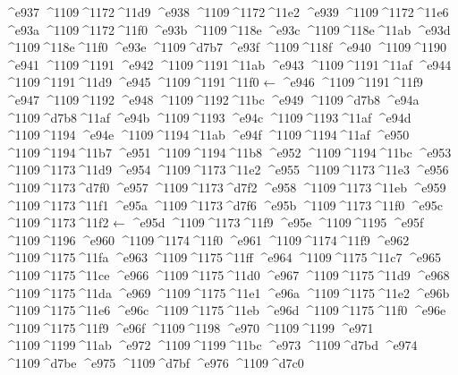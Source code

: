 \checkit ^^^^e937 ^^^^1109^^^^1172^^^^11d9
\checkit ^^^^e938 ^^^^1109^^^^1172^^^^11e2
\checkit ^^^^e939 ^^^^1109^^^^1172^^^^11e6
\checkit ^^^^e93a ^^^^1109^^^^1172^^^^11f0
\checkit ^^^^e93b ^^^^1109^^^^118e
\checkit ^^^^e93c ^^^^1109^^^^118e^^^^11ab
\checkit ^^^^e93d ^^^^1109^^^^118e^^^^11f0
\checkit ^^^^e93e ^^^^1109^^^^d7b7
\checkit ^^^^e93f ^^^^1109^^^^118f
\checkit ^^^^e940 ^^^^1109^^^^1190
\checkit ^^^^e941 ^^^^1109^^^^1191
\checkit ^^^^e942 ^^^^1109^^^^1191^^^^11ab
\checkit ^^^^e943 ^^^^1109^^^^1191^^^^11af
\checkit ^^^^e944 ^^^^1109^^^^1191^^^^11d9
\checkit ^^^^e945 ^^^^1109^^^^1191^^^^11f0 ←
\checkit ^^^^e946 ^^^^1109^^^^1191^^^^11f9
\checkit ^^^^e947 ^^^^1109^^^^1192
\checkit ^^^^e948 ^^^^1109^^^^1192^^^^11bc
\checkit ^^^^e949 ^^^^1109^^^^d7b8
\checkit ^^^^e94a ^^^^1109^^^^d7b8^^^^11af
\checkit ^^^^e94b ^^^^1109^^^^1193
\checkit ^^^^e94c ^^^^1109^^^^1193^^^^11af
\checkit ^^^^e94d ^^^^1109^^^^1194
\checkit ^^^^e94e ^^^^1109^^^^1194^^^^11ab
\checkit ^^^^e94f ^^^^1109^^^^1194^^^^11af
\checkit ^^^^e950 ^^^^1109^^^^1194^^^^11b7
\checkit ^^^^e951 ^^^^1109^^^^1194^^^^11b8
\checkit ^^^^e952 ^^^^1109^^^^1194^^^^11bc
\checkit ^^^^e953 ^^^^1109^^^^1173^^^^11d9
\checkit ^^^^e954 ^^^^1109^^^^1173^^^^11e2
\checkit ^^^^e955 ^^^^1109^^^^1173^^^^11e3
\checkit ^^^^e956 ^^^^1109^^^^1173^^^^d7f0
\checkit ^^^^e957 ^^^^1109^^^^1173^^^^d7f2
\checkit ^^^^e958 ^^^^1109^^^^1173^^^^11eb
\checkit ^^^^e959 ^^^^1109^^^^1173^^^^11f1
\checkit ^^^^e95a ^^^^1109^^^^1173^^^^d7f6
\checkit ^^^^e95b ^^^^1109^^^^1173^^^^11f0
\checkit ^^^^e95c ^^^^1109^^^^1173^^^^11f2 ←
\checkit ^^^^e95d ^^^^1109^^^^1173^^^^11f9
\checkit ^^^^e95e ^^^^1109^^^^1195
\checkit ^^^^e95f ^^^^1109^^^^1196
\checkit ^^^^e960 ^^^^1109^^^^1174^^^^11f0
\checkit ^^^^e961 ^^^^1109^^^^1174^^^^11f9
\checkit ^^^^e962 ^^^^1109^^^^1175^^^^11fa
\checkit ^^^^e963 ^^^^1109^^^^1175^^^^11ff
\checkit ^^^^e964 ^^^^1109^^^^1175^^^^11c7
\checkit ^^^^e965 ^^^^1109^^^^1175^^^^11ce
\checkit ^^^^e966 ^^^^1109^^^^1175^^^^11d0
\checkit ^^^^e967 ^^^^1109^^^^1175^^^^11d9
\checkit ^^^^e968 ^^^^1109^^^^1175^^^^11da
\checkit ^^^^e969 ^^^^1109^^^^1175^^^^11e1
\checkit ^^^^e96a ^^^^1109^^^^1175^^^^11e2
\checkit ^^^^e96b ^^^^1109^^^^1175^^^^11e6
\checkit ^^^^e96c ^^^^1109^^^^1175^^^^11eb
\checkit ^^^^e96d ^^^^1109^^^^1175^^^^11f0
\checkit ^^^^e96e ^^^^1109^^^^1175^^^^11f9
\checkit ^^^^e96f ^^^^1109^^^^1198
\checkit ^^^^e970 ^^^^1109^^^^1199
\checkit ^^^^e971 ^^^^1109^^^^1199^^^^11ab
\checkit ^^^^e972 ^^^^1109^^^^1199^^^^11bc
\checkit ^^^^e973 ^^^^1109^^^^d7bd
\checkit ^^^^e974 ^^^^1109^^^^d7be
\checkit ^^^^e975 ^^^^1109^^^^d7bf
\checkit ^^^^e976 ^^^^1109^^^^d7c0
